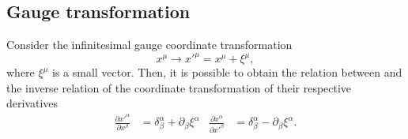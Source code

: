 \documentclass{article}
\begin{document}
\subsection{Gauge transformation}

Consider the infinitesimal gauge coordinate transformation
\begin{equation}
    \label{gauge transformation}
    x^{\mu} \longrightarrow x'^{\mu} =  x^{\mu} + \xi^{\mu},
\end{equation}
where $\xi^{\mu}$ is a small vector. Then, it is possible to obtain the relation
between and the inverse relation of the coordinate transformation of their respective
derivatives 
\begin{align}
    \label{gauge transformation derivatives}
    \frac{\partial x'^{\alpha}}{\partial x^{\beta}} & = \delta^{\alpha}_{\beta} 
    + \partial_{\beta} \xi^{\alpha} & 
    \frac{\partial x^{\alpha}}{\partial x'^{\beta}} & = \delta^{\alpha}_{\beta} 
    - \partial_{\beta} \xi^{\alpha}.
\end{align}
\end{document}
